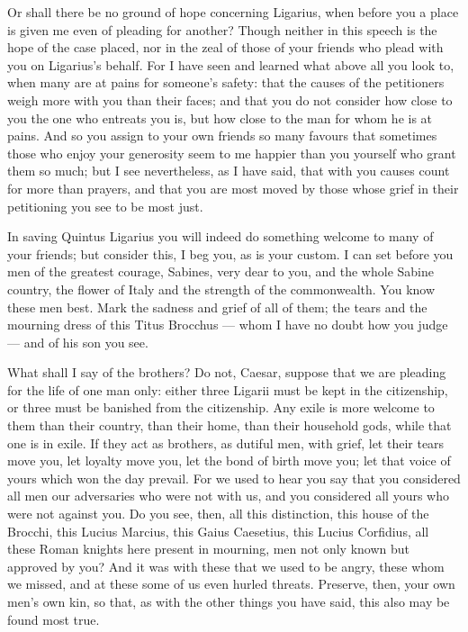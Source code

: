  Or shall there be no ground of hope concerning Ligarius, when before you a place is given me even of pleading for another? Though neither in this speech is the hope of the case placed, nor in the zeal of those of your friends who plead with you on Ligarius's behalf. For I have seen and learned what above all you look to, when many are at pains for someone's safety: that the causes of the petitioners weigh more with you than their faces; and that you do not consider how close to you the one who entreats you is, but how close to the man for whom he is at pains. And so you assign to your own friends so many favours that sometimes those who enjoy your generosity seem to me happier than you yourself who grant them so much; but I see nevertheless, as I have said, that with you causes count for more than prayers, and that you are most moved by those whose grief in their petitioning you see to be most just.

 In saving Quintus Ligarius you will indeed do something welcome to many of your friends; but consider this, I beg you, as is your custom. I can set before you men of the greatest courage, Sabines, very dear to you, and the whole Sabine country, the flower of Italy and the strength of the commonwealth. You know these men best. Mark the sadness and grief of all of them; the tears and the mourning dress of this Titus Brocchus --- whom I have no doubt how you judge --- and of his son you see.

 What shall I say of the brothers? Do not, Caesar, suppose that we are pleading for the life of one man only: either three Ligarii must be kept in the citizenship, or three must be banished from the citizenship. Any exile is more welcome to them than their country, than their home, than their household gods, while that one is in exile. If they act as brothers, as dutiful men, with grief, let their tears move you, let loyalty move you, let the bond of birth move you; let that voice of yours which won the day prevail. For we used to hear you say that you considered all men our adversaries who were not with us, and you considered all yours who were not against you. Do you see, then, all this distinction, this house of the Brocchi, this Lucius Marcius, this Gaius Caesetius, this Lucius Corfidius, all these Roman knights here present in mourning, men not only known but approved by you? And it was with these that we used to be angry, these whom we missed, and at these some of us even hurled threats. Preserve, then, your own men's own kin, so that, as with the other things you have said, this also may be found most true.

